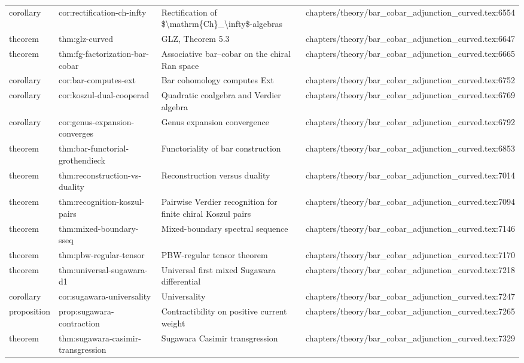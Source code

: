 \documentclass[11pt]{article}
\begin{document}
\begin{longtable}{L{0.10\textwidth}L{0.26\textwidth}L{0.42\textwidth}L{0.22\textwidth}}
corollary & cor:rectification-ch-infty & Rectification of \$\textbackslash{}mathrm\{Ch\}\_\textbackslash{}infty\$-algebras & chapters/theory/bar\_cobar\_adjunction\_curved.tex:6554\\
theorem & thm:glz-curved & GLZ, Theorem 5.3 & chapters/theory/bar\_cobar\_adjunction\_curved.tex:6647\\
theorem & thm:fg-factorization-bar-cobar & Associative bar--cobar on the chiral Ran space & chapters/theory/bar\_cobar\_adjunction\_curved.tex:6665\\
corollary & cor:bar-computes-ext & Bar cohomology computes Ext & chapters/theory/bar\_cobar\_adjunction\_curved.tex:6752\\
corollary & cor:koszul-dual-cooperad & Quadratic coalgebra and Verdier algebra & chapters/theory/bar\_cobar\_adjunction\_curved.tex:6769\\
corollary & cor:genus-expansion-converges & Genus expansion convergence & chapters/theory/bar\_cobar\_adjunction\_curved.tex:6792\\
theorem & thm:bar-functorial-grothendieck & Functoriality of bar construction & chapters/theory/bar\_cobar\_adjunction\_curved.tex:6853\\
theorem & thm:reconstruction-vs-duality & Reconstruction versus duality & chapters/theory/bar\_cobar\_adjunction\_curved.tex:7014\\
theorem & thm:recognition-koszul-pairs & Pairwise Verdier recognition for finite chiral Koszul pairs & chapters/theory/bar\_cobar\_adjunction\_curved.tex:7094\\
theorem & thm:mixed-boundary-sseq & Mixed-boundary spectral sequence & chapters/theory/bar\_cobar\_adjunction\_curved.tex:7146\\
theorem & thm:pbw-regular-tensor & PBW-regular tensor theorem & chapters/theory/bar\_cobar\_adjunction\_curved.tex:7170\\
theorem & thm:universal-sugawara-d1 & Universal first mixed Sugawara differential & chapters/theory/bar\_cobar\_adjunction\_curved.tex:7218\\
corollary & cor:sugawara-universality & Universality & chapters/theory/bar\_cobar\_adjunction\_curved.tex:7247\\
proposition & prop:sugawara-contraction & Contractibility on positive current weight & chapters/theory/bar\_cobar\_adjunction\_curved.tex:7265\\
theorem & thm:sugawara-casimir-transgression & Sugawara Casimir transgression & chapters/theory/bar\_cobar\_adjunction\_curved.tex:7329\\

\end{longtable}
\end{document}
